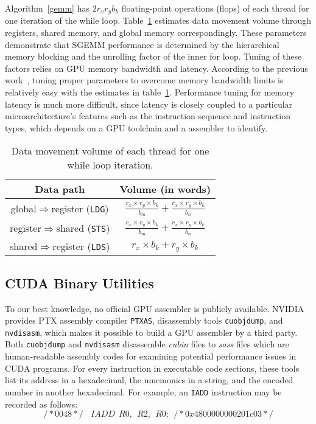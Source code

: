 Algorithm~\ref{gemm} has $2 r_x r_y b_k$ floating-point operations (flops) of each thread for one iteration of the while loop.
Table~\ref{tab:dm} estimates data movement volume through registers, shared memory, and global 
memory correspondingly.
These parameters demonstrate that SGEMM performance is determined by the hierarchical memory blocking and the unrolling factor of the inner for loop.
Tuning of these factors relies on GPU memory bandwidth and latency. 
According to the previous work~\cite{magma,tan}, tuning proper parameters to overcome memory bandwidth limits is relatively easy with the estimates in table~\ref{tab:dm}.
Performance tuning for memory latency is much more difficult, since latency is closely coupled to a particular microarchitecture's features such as the instruction sequence and instruction types, which depends on a GPU toolchain and a assembler to identify. 


\begin{table}[htbp]
    \caption{Data movement volume of each thread for one while loop iteration.} %
\centering
\scalebox{1.0} {
\begin{tabular}{|c|c|}
\hline
    Data path& Volume (in words)\\
\hline
    global$\Rightarrow$register ({\tt LDG})& $\frac{r_x \times r_y \times b_k}{b_m} + \frac{r_x\times r_y \times b_k}{b_n}$ \\
\hline
register$\Rightarrow$shared ({\tt STS})& $\frac{r_x \times r_y \times b_k}{b_m} + \frac{r_x\times r_y \times b_k}{b_n}$ \\
\hline
shared$\Rightarrow$register ({\tt LDS})& $r_x\times b_k + r_y\times b_k$\\
\hline
\end{tabular}
}
\label{tab:dm}
\end{table}


\subsection{CUDA Binary Utilities}
\label{sec:cuda}

To our best knowledge, no official GPU assembler is publicly available.
NVIDIA provides PTX assembly compiler {\tt PTXAS}, disassembly tools {\tt cuobjdump}, and {\tt nvdisasm}, which makes it possible to build a GPU assembler by a third party.
Both {\tt cuobjdump} and {\tt nvdisasm} disassemble {\em cubin} files to {\em sass} files which are human-readable assembly codes for examining potential performance issues in CUDA programs. 
For every instruction in executable code sections, these tools list its address in a hexadecimal, the mnemonics in a string, and the encoded number in another hexadecimal. 
For example, an {\tt IADD} instruction may be recorded as follows:
{\small
\begin{equation}
/*0048*/~~~~IADD~~R0,~~R2,~~R0;~~/* 0x4800000000201c03 */
\end{equation}
}

